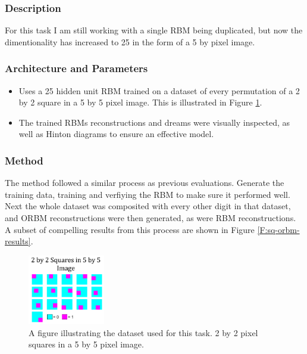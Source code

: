 \subsubsection{Description}
For this task I am still working with a single RBM being duplicated, but now the dimentionality has increased to 25 in the form of a 5 by pixel image.
\subsubsection{Architecture and Parameters}
\begin{itemize}
  \item Uses a 25 hidden unit RBM trained on a dataset of every permutation of a 2 by 2 square in a 5 by 5 pixel image. This is illustrated in Figure \ref{F:Sq-Dataset}.
  \item The trained RBMs reconstructions and dreams were visually inspected, as well as Hinton diagrams to ensure an effective model.
\end{itemize}

\subsubsection{Method}

The method followed a similar process as previous evaluations. Generate the training data, training and verfiying the RBM to make sure it performed well.
Next the whole dataset was composited with every other digit in that dataset, and ORBM reconstructions were then generated, as were RBM reconstructions. A subset of compelling results from this process are shown in Figure \ref{F:sq-orbm-results}.

\begin{figure}
  \begin{center}
    \includegraphics[width=0.3\textwidth]{Assets/results/sq-dataset.png}
  \end{center}
  \caption{A figure illustrating the dataset used for this task. 2 by 2 pixel squares in a 5 by 5 pixel image.}
  \label{F:Sq-Dataset}
\end{figure}

